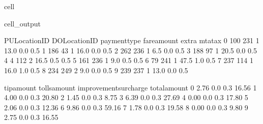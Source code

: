 \documentclass[letterpaper,10pt,english]{sphinxmanual}
\begin{document}
\begin{sphinxuseclass}{cell}
\begin{sphinxuseclass}{cell_output}
\begin{sphinxVerbatim}[commandchars=\\\{\}]
   PULocationID  DOLocationID  payment\PYGZus{}type  fare\PYGZus{}amount  extra  mta\PYGZus{}tax  \PYGZbs{}
0           100           231             1         13.0    0.0      0.5   
1           186            43             1         16.0    0.0      0.5   
2           262           236             1          6.5    0.0      0.5   
3           188            97             1         20.5    0.0      0.5   
4             4           112             2         16.5    0.5      0.5   
5           161           236             1          9.0    0.5      0.5   
6            79           241             1         47.5    1.0      0.5   
7           237           114             1         16.0    1.0      0.5   
8           234           249             2          9.0    0.0      0.5   
9           239           237             1         13.0    0.0      0.5   

   tip\PYGZus{}amount  tolls\PYGZus{}amount  improvement\PYGZus{}surcharge  total\PYGZus{}amount  
0        2.76           0.0                    0.3         16.56  
1        4.00           0.0                    0.3         20.80  
2        1.45           0.0                    0.3          8.75  
3        6.39           0.0                    0.3         27.69  
4        0.00           0.0                    0.3         17.80  
5        2.06           0.0                    0.3         12.36  
6        9.86           0.0                    0.3         59.16  
7        1.78           0.0                    0.3         19.58  
8        0.00           0.0                    0.3          9.80  
9        2.75           0.0                    0.3         16.55  
\end{sphinxVerbatim}

\end{sphinxuseclass}
\end{sphinxuseclass}
\end{document}
